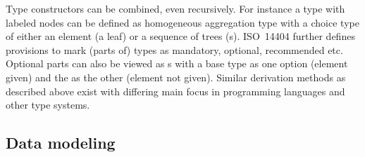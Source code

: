 
Type constructors can be combined, even recursively. For instance a 
type with labeled  nodes can be defined as homogeneous aggregation
type with a choice type of either an element (a leaf) or a sequence of trees
(s). ISO~14404 further defines provisions to mark (parts of)
types as mandatory, optional, recommended etc. Optional parts can also be viewed
as s with a base type as one option (element given) and the 
 as the other (element not given). Similar derivation methods as
described above exist with differing main focus in programming languages and other
type systems.




\subsection{Data modeling}
\label{sec:datamodeling}

